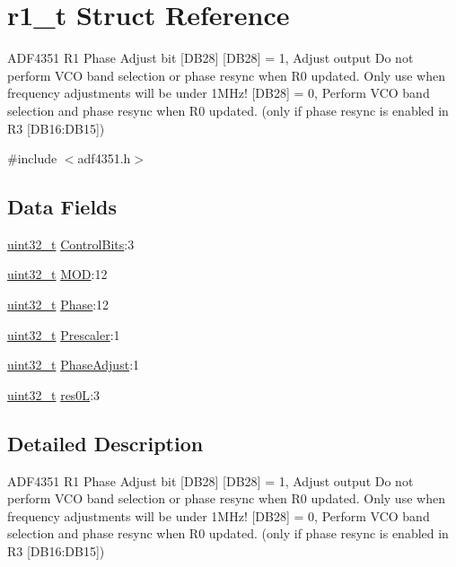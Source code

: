 \hypertarget{structr1__t}{}\section{r1\+\_\+t Struct Reference}
\label{structr1__t}


A\+D\+F4351 R1 Phase Adjust bit \mbox{[}D\+B28\mbox{]} \mbox{[}D\+B28\mbox{]} = 1, Adjust output Do not perform V\+CO band selection or phase resync when R0 updated. Only use when frequency adjustments will be under 1\+M\+Hz! \mbox{[}D\+B28\mbox{]} = 0, Perform V\+CO band selection and phase resync when R0 updated. (only if phase resync is enabled in R3 \mbox{[}D\+B16\+:D\+B15\mbox{]})  




{\ttfamily \#include $<$adf4351.\+h$>$}

\subsection*{Data Fields}
\begin{DoxyCompactItemize}
\item 
\hyperlink{send_8c_a435d1572bf3f880d55459d9805097f62}{uint32\+\_\+t} \hyperlink{structr1__t_a5335bbd53d06ad7afb879d919033404c}{Control\+Bits}\+:3
\item 
\hyperlink{send_8c_a435d1572bf3f880d55459d9805097f62}{uint32\+\_\+t} \hyperlink{structr1__t_a9ea14fcf64bbacfbcfa5afa992c0b87d}{M\+OD}\+:12
\item 
\hyperlink{send_8c_a435d1572bf3f880d55459d9805097f62}{uint32\+\_\+t} \hyperlink{structr1__t_a08f87626a225a1256a9c45bb0d42af8a}{Phase}\+:12
\item 
\hyperlink{send_8c_a435d1572bf3f880d55459d9805097f62}{uint32\+\_\+t} \hyperlink{structr1__t_a9ee672a7fdd3a2d60591d43557feb390}{Prescaler}\+:1
\item 
\hyperlink{send_8c_a435d1572bf3f880d55459d9805097f62}{uint32\+\_\+t} \hyperlink{structr1__t_a339b676bde09218794b49904eb456a38}{Phase\+Adjust}\+:1
\item 
\hyperlink{send_8c_a435d1572bf3f880d55459d9805097f62}{uint32\+\_\+t} \hyperlink{structr1__t_a0ce8c11e3227892e5d9afcde148d9300}{res0L}\+:3
\end{DoxyCompactItemize}


\subsection{Detailed Description}
A\+D\+F4351 R1 Phase Adjust bit \mbox{[}D\+B28\mbox{]} \mbox{[}D\+B28\mbox{]} = 1, Adjust output Do not perform V\+CO band selection or phase resync when R0 updated. Only use when frequency adjustments will be under 1\+M\+Hz! \mbox{[}D\+B28\mbox{]} = 0, Perform V\+CO band selection and phase resync when R0 updated. (only if phase resync is enabled in R3 \mbox{[}D\+B16\+:D\+B15\mbox{]}) 

